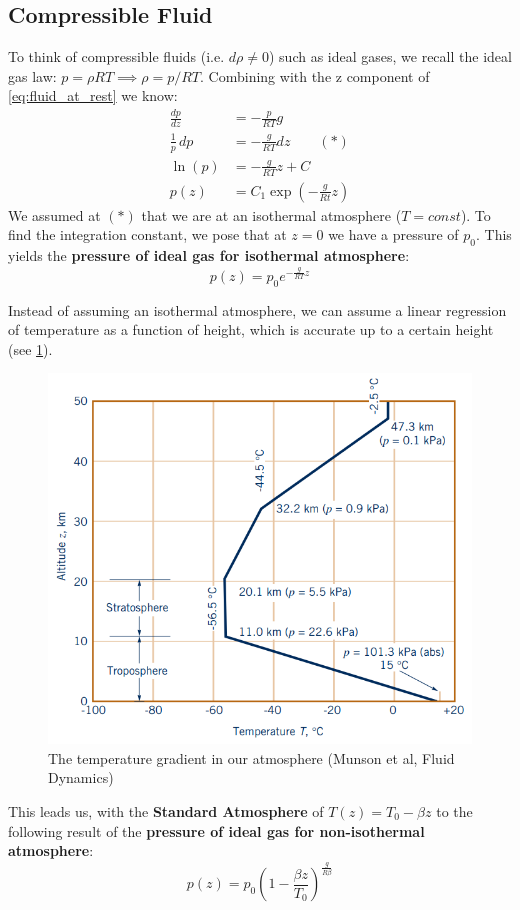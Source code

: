 \subsection{Compressible Fluid}
To think of compressible fluids (i.e. $d\rho \ne 0$) such as ideal gases, we recall the ideal gas law: $p=\rho R T\implies \rho = p/{RT}$. Combining with the z component of \eqref{eq:fluid_at_rest} we know:
\begin{equation*}
	\begin{split}
		\frac{dp}{dz} &= -\frac{p}{RT}g\\
		\frac 1p \,dp &= -\frac g{RT} dz\qquad (\ast)\\
		\ln(p) &= -\frac g{RT}z + C\\
		p(z) &= C_1\exp\left(-\frac{g}{Rt}z\right)
	\end{split}
\end{equation*}
We assumed at $(\ast)$ that we are at an isothermal atmosphere ($T=const$). To find the integration constant, we pose that at $z=0$ we have a pressure of $p_0$. This yields the \textbf{pressure of ideal gas for isothermal atmosphere}:
\begin{equation}
	\boxed{p(z)=p_0e^{-\frac g{RT}z }}
	\label{eq:pressure_compressible_isothermal}
\end{equation}

Instead of assuming an isothermal atmosphere, we can assume a linear regression of temperature as a function of height, which is accurate up to a certain height (see \ref{fig:temperatureatmosphere}).
\begin{figure}
	\centering
	\includegraphics[width=0.4\linewidth]{Sketches/TemperatureAtmosphere}
	\caption{The temperature gradient in our atmosphere (Munson et al, Fluid Dynamics)}
	\label{fig:temperatureatmosphere}
\end{figure}
This leads us, with the \textbf{Standard Atmosphere} of $T(z) = T_0-\beta z$ to the following result of the \textbf{pressure of ideal gas for non-isothermal atmosphere}:
\begin{equation}
	\boxed{p(z)=p_0(1-\frac{\beta z}{T_0})^{\frac{g}{R\beta}}}
\end{equation}


